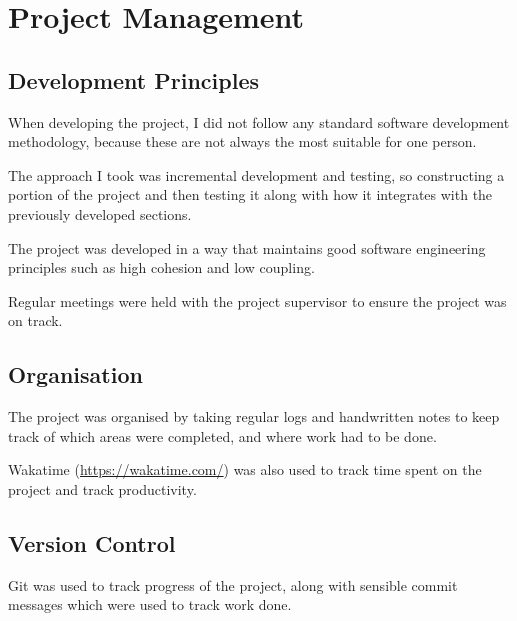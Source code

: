 \section{Project Management}
\subsection{Development Principles}
When developing the project, I did not follow any standard software development meth\-odology, because these are not always the most suitable for one person.\par
The approach I took was incremental development and testing, so constructing a portion of the project and then testing it along with how it integrates with the previously developed sections.\par
The project was developed in a way that maintains good software engineering principles such as high cohesion and low coupling.\par
Regular meetings were held with the project supervisor to ensure the project was on track.
\subsection{Organisation}
The project was organised by taking regular logs and handwritten notes to keep track of which areas were completed, and where work had to be done.\par
Wakatime (\url{https://wakatime.com/}) was also used to track time spent on the project and track productivity.
\subsection{Version Control}
Git was used to track progress of the project, along with sensible commit messages which were used to track work done.
